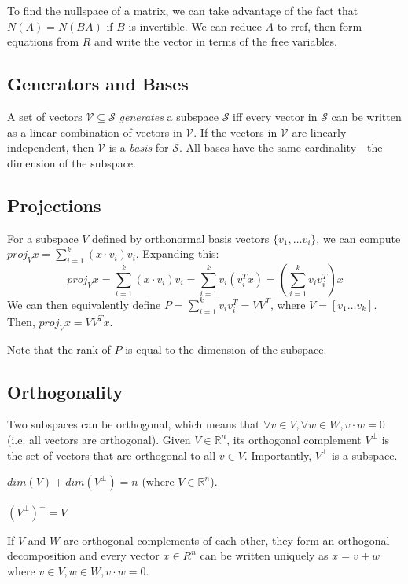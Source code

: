 \documentclass[10pt]{extarticle}
\newcommand{\R}{\mathbb{R}}
\begin{document}
\begin{multicols*}{2}
To find the nullspace of a matrix, we can take advantage of the fact that $N(A) = N(BA)$ if $B$ is invertible. We can reduce $A$ to rref, then form equations from $R$ and write the vector in terms of the free variables.


\subsection{Generators and Bases}
A set of vectors $\mathcal{V} \subseteq \mathcal{S}$ \emph{generates} a subspace $\mathcal{S}$ iff every vector in $\mathcal{S}$ can be written as a linear combination of vectors in $\mathcal{V}$. If the vectors in $\mathcal{V}$ are linearly independent, then $\mathcal{V}$ is a \emph{basis} for $\mathcal{S}$. All bases have the same cardinality---the dimension of the subspace.




\subsection{Projections}
For a subspace $V$ defined by orthonormal basis vectors $\{v_1, \ldots v_i\}$, we can compute $proj_V x = \sum_{i=1}^{k} (x\cdot v_i)v_i$. Expanding this:
\[ proj_V x = \sum_{i=1}^{k} (x\cdot v_i)v_i = \sum_{i=1}^{k} v_i(v_i^Tx) = (\sum_{i=1}^{k} v_iv_i^T)x \]
We can then equivalently define $P = \sum_{i=1}^k v_i v_i^T = VV^T$, where $V = [v_1 \ldots v_k]$. Then, $proj_V x = VV^T x$.

Note that the rank of $P$ is equal to the dimension of the subspace.

\subsection{Orthogonality}
Two subspaces can be orthogonal, which means that $\forall v \in V, \forall w \in W, v\cdot w = 0$ (i.e. all vectors are orthogonal). Given $V \in \R^n$, its orthogonal complement $V^\bot$ is the set of vectors that are orthogonal to all $v \in V$. Importantly, $V^\bot$ is a subspace.
\begin{compactitem}
	\item $dim(V) + dim(V^\bot) = n$ (where $V \in \R^n$).	
	\item $(V^\bot)^\bot = V$
\end{compactitem}
If $V$ and $W$ are orthogonal complements of each other, they form an orthogonal decomposition and every vector $x \in R^n$ can be written uniquely as $x = v + w$ where $v \in V, w \in W, v\cdot w = 0$.


\end{multicols*}
\end{document}

